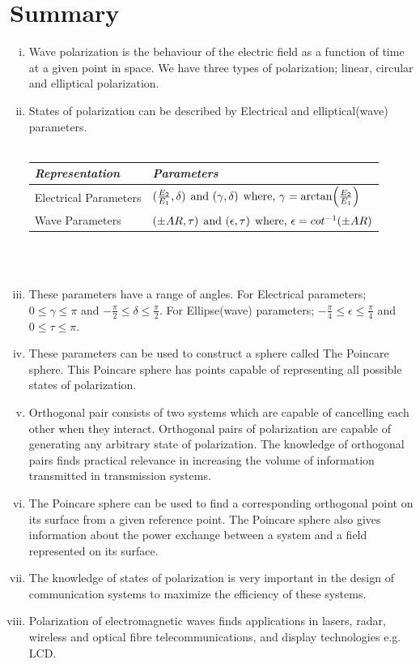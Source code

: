\section{Summary}
\begin{enumerate}[(i)]
\item Wave polarization is the behaviour of the electric field as a function of time at a given point in space. We have three types of polarization; linear, circular and elliptical polarization.
\item States of polarization can be described by Electrical and elliptical(wave) parameters. \\
\\
\begin{tabular}{|l|m{4.5cm}|}
\hline 
\textit{Representation} &\textit{Parameters} \\ \hline %
Electrical Parameters &  $ (\frac{E_{2}}{E_{1}}, \delta)\hspace{0.15cm}  \text{and } (\gamma, \delta)\hspace{0.15cm} \text{where, } \gamma = \arctan(\frac{E_{2}}{E_{1}}) $\\  \hline     %
Wave Parameters & $ (\pm AR, \tau)\hspace{0.15cm}  \text{and } (\epsilon, \tau)\hspace{0.15cm} \text{where, } \epsilon = cot^{-1}(\pm AR) $ \\ \hline %
\end{tabular} \\
\\
\item These parameters have a range of angles. For Electrical parameters; $ 0 \leq \gamma \leq \pi $ and $ -\frac{\pi}{2} \leq \delta \leq \frac{\pi}{2}$. For Ellipse(wave) parameters; $ -\frac{\pi}{4} \leq \epsilon \leq \frac{\pi}{4}$ and $ 0 \leq \tau \leq \pi $.
\item These parameters can be used to construct a sphere called The Poincare sphere. This Poincare sphere has points capable of representing all possible states of polarization.
\item  Orthogonal pair consists of two systems which are capable of cancelling each other when they interact. Orthogonal pairs of polarization are capable of generating any arbitrary state of polarization. The knowledge of orthogonal pairs finds practical relevance in increasing the volume of information transmitted in transmission systems. 
\item The Poincare sphere can be used to find a corresponding orthogonal point on its surface from a given reference point. The Poincare sphere also gives information about the power exchange between a system and a field represented on its surface.
\item The knowledge of states of polarization is very important in the design of communication systems to maximize the efficiency of these systems. 
\item  Polarization of electromagnetic waves finds applications in lasers, radar, wireless and optical fibre telecommunications, and display technologies e.g. LCD.
\end{enumerate}
